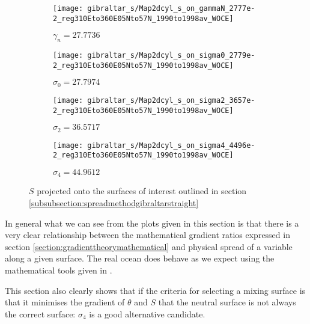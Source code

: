 \begin{figure}[htbp]
    \centering
     \begin{subfigure}[b]{0.4\textwidth}
         \centering
         \texttt{[image: gibraltar\_s/Map2dcyl\_s\_on\_gammaN\_2777e-2\_reg310Eto360E05Nto57N\_1990to1998av\_WOCE]}
         \caption{$\gamma_n = 27.7736$}
         \label{fig:subplot_gibraltar_S_gammaN}
     \end{subfigure}
     \hfill
     \begin{subfigure}[b]{0.4\textwidth}
         \centering
         \texttt{[image: gibraltar\_s/Map2dcyl\_s\_on\_sigma0\_2779e-2\_reg310Eto360E05Nto57N\_1990to1998av\_WOCE]}
         \caption{$\sigma_0 = 27.7974$}
         \label{fig:subplot_gibraltar_S_sig0}
     \end{subfigure}
    \begin{subfigure}[b]{0.4\textwidth}
         \centering
         \texttt{[image: gibraltar\_s/Map2dcyl\_s\_on\_sigma2\_3657e-2\_reg310Eto360E05Nto57N\_1990to1998av\_WOCE]}
         \caption{$\sigma_2 = 36.5717$}
         \label{fig:subplot_gibraltar_S_sig2}
     \end{subfigure}
     \hfill
     \begin{subfigure}[b]{0.4\textwidth}
         \centering
         \texttt{[image: gibraltar\_s/Map2dcyl\_s\_on\_sigma4\_4496e-2\_reg310Eto360E05Nto57N\_1990to1998av\_WOCE]}
         \caption{$\sigma_4 = 44.9612$}
         \label{fig:subplot_gibraltar_S_sig4}
     \end{subfigure}
    \caption{$S$ projected onto the surfaces of interest outlined in section \ref{subsubsection:spreadmethodgibraltarstraight}}
    \label{fig:gibraltar_S}
\end{figure}

In general what we can see from the plots given in this section is that there is a very clear relationship between the mathematical gradient ratios expressed in section \ref{section:gradienttheorymathematical} and physical spread of a variable along a given surface. The real ocean does behave as we expect using the mathematical tools given in \citet{McDougall1987}. 

This section also clearly shows that if the criteria for selecting a mixing surface is that it minimises the gradient of $\theta$ and $S$ that the neutral surface is not always the correct surface: $\sigma_4$ is a good alternative candidate. 
